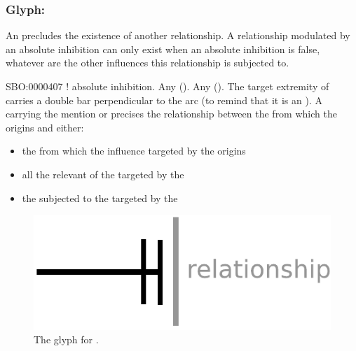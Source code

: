
\subsubsection{Glyph: }\label{sec:absoluteInhibition}

An  precludes the existence of another relationship. A relationship modulated by an absolute inhibition can only exist when an absolute inhibition is false, whatever are the other influences this relationship is subjected to.

\begin{glyphDescription}
 \glyphSboTerm SBO:0000407 ! absolute inhibition.
 \glyphOrigin Any  ().
 \glyphTarget Any  ().
 \glyphEndPoint The target extremity of   carries a double bar perpendicular to the arc (to remind that it is an ).
 \glyphAux A  carrying the mention  or  precises the relationship between the  from which the  origins and either:
\begin{itemize}
\item the  from which the influence targeted by the  origins
\item all the relevant  of the  targeted by the 
\item the  subjected to the  targeted by the 
\end{itemize}

 \end{glyphDescription}

\begin{figure}[H]
  \centering
  \includegraphics[scale = 0.5]{images/absoluteInhibition}
  \caption{The \ER glyph for .}
  \label{fig:absoluteInhibition}
\end{figure}


